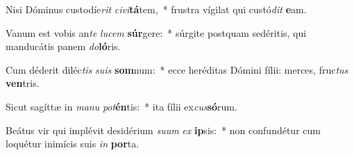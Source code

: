 \item Nisi Dóminus custodíe\textit{rit} \textit{ci}\textit{vi}\textbf{tá}tem,~* frustra vígilat qui custó\textit{dit} \textbf{e}am.
\item Vanum est vobis an\textit{te} \textit{lu}\textit{cem} \textbf{súr}gere:~* súrgite postquam sedéritis, qui manducátis panem \textit{do}\textbf{ló}ris.
\item Cum déderit diléc\textit{tis} \textit{su}\textit{is} \textbf{som}num:~* ecce heréditas Dómini fílii: merces, fruc\textit{tus} \textbf{ven}tris.
\item Sicut sagíttæ in \textit{ma}\textit{nu} \textit{pot}\textbf{én}tis:~* ita fílii ex\textit{cus}\textbf{só}rum.
\item Beátus vir qui implévit desidérium \textit{su}\textit{um} \textit{ex} \textbf{ip}sis:~* non confundétur cum loquétur inimícis suis \textit{in} \textbf{por}ta.
